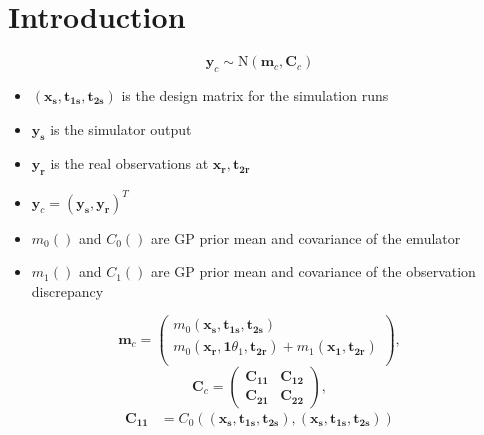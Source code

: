 \documentclass[12pt]{article}
\date{}
\begin{document}
%

\def\spacingset#1{\renewcommand{\baselinestretch}%
{#1}\small\normalsize} \spacingset{1}



\spacingset{1} %
\section{Introduction}
\label{introduction}
%


\begin{minipage}{.8\textwidth}
	\[\mathbf y_c\sim \mathrm{N}(\mathbf m_c,\mathbf C_c)\]
	\begin{itemize}
		\setlength\itemsep{0em}
		\item $(\mathbf{x_s},\mathbf{t_{1s}},\mathbf{t_{2s}})$ is the design matrix for the simulation runs
		\item $\mathbf{y_s}$ is the simulator output
		\item $\mathbf{y_r}$ is the real observations at $\mathbf{x_r},\mathbf{t_{2r}}$
		\item  $\mathbf y_c = (\mathbf{y_s},\mathbf{y_r})^T$
		\item $m_0()$ and $C_0()$ are GP prior mean and covariance of the emulator
		\item $m_1()$ and $C_1()$ are GP prior mean and covariance of the observation discrepancy
	\end{itemize}
	\[
	\mathbf m_c = \begin{pmatrix}
	m_0(\mathbf{x_s},\mathbf{t_{1s}},\mathbf{t_{2s}})\\
	m_0(\mathbf{x_r},\mathbf1\theta_1,\mathbf{t_{2r}}) + m_1(\mathbf{x_1},\mathbf{t_{2r}})\\
	\end{pmatrix},
	\]
	\[
	\mathbf C_c = \begin{pmatrix}
	\mathbf{C_{11}} & \mathbf{C_{12}} \\
	\mathbf{C_{21}} & \mathbf{C_{22}}
	\end{pmatrix},
	\]
	\vspace{-1.5em}
	\begin{align*}
	\mathbf{C_{11}}&=C_0\left((\mathbf{x_s},\mathbf{t_{1s}},\mathbf{t_{2s}}),(\mathbf{x_s},\mathbf{t_{1s}},\mathbf{t_{2s}})\right)\\

\end{align*}
\end{minipage}
\end{document}
